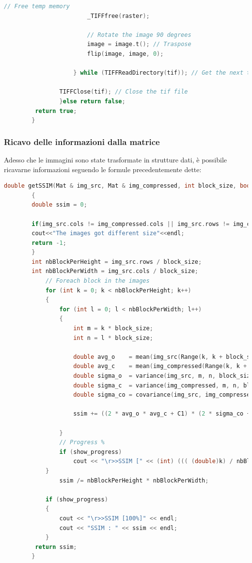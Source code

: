 \documentclass[a4paper,11pt]{article}
\begin{document}
\begin{lstlisting}[language=C++]
                        // Free temp memory
                        _TIFFfree(raster); 

                        // Rotate the image 90 degrees 
                        image = image.t(); // Traspose
                        flip(image, image, 0);
                    
                    } while (TIFFReadDirectory(tif)); // Get the next tif to go into the channels

                TIFFClose(tif); // Close the tif file
                }else return false;
         return true;
        }
    \end{lstlisting}
    \subsubsection{Ricavo delle informazioni dalla matrice}
    Adesso che le immagini sono state trasformate in strutture dati, è possibile ricavarne informazioni seguendo le formule precedentemente dette:
    \begin{lstlisting}[language=C++]
        double getSSIM(Mat & img_src, Mat & img_compressed, int block_size, bool show_progress = true)
        {
        double ssim = 0;

        if(img_src.cols != img_compressed.cols || img_src.rows != img_compressed.rows){
        cout<<"The images got different size"<<endl;
        return -1;
        }
        int nbBlockPerHeight = img_src.rows / block_size;
        int nbBlockPerWidth = img_src.cols / block_size;
            // Foreach block in the images
            for (int k = 0; k < nbBlockPerHeight; k++)
            {
                for (int l = 0; l < nbBlockPerWidth; l++)
                {
                    int m = k * block_size;
                    int n = l * block_size;

                    double avg_o 	= mean(img_src(Range(k, k + block_size), Range(l, l + block_size)))[0];
                    double avg_c 	= mean(img_compressed(Range(k, k + block_size), Range(l, l + block_size)))[0];
                    double sigma_o 	= variance(img_src, m, n, block_size);
                    double sigma_c 	= variance(img_compressed, m, n, block_size);
                    double sigma_co	= covariance(img_src, img_compressed, m, n, block_size);

                    ssim += ((2 * avg_o * avg_c + C1) * (2 * sigma_co + C2)) / ((avg_o * avg_o + avg_c * avg_c + C1) * (sigma_o * sigma_o + sigma_c * sigma_c + C2));
                    
                }
                // Progress %
                if (show_progress)
                    cout << "\r>>SSIM [" << (int) ((( (double)k) / nbBlockPerHeight) * 100) << "%]";
            }
                ssim /= nbBlockPerHeight * nbBlockPerWidth;

            if (show_progress)
            {
                cout << "\r>>SSIM [100%]" << endl;
                cout << "SSIM : " << ssim << endl;
            }
         return ssim;
        }
    \end{lstlisting}
\end{document}
